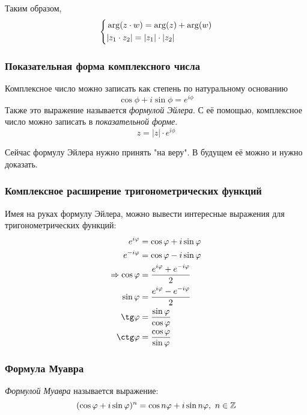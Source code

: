 Таким образом,
$$
    \left\{\begin{aligned}
    &\arg(z \cdot w) = \arg(z) + \arg(w)
    \\
    &|z_1 \cdot z_2| = |z_1| \cdot |z_2|
    \end{aligned}\right.
$$

\subsubsection{Показательная форма комплексного числа}

\begin{definition}
    Комплексное число можно записать как степень по натуральному основанию
    $$
        \cos \phi + i \sin \phi = e^{i \phi}
    $$
    Также это выражение называется \textit{формулой Эйлера}. С её помощью, комплексное число можно записать в \textit{показательной форме}.
    $$
        z = |z| \cdot e^{i \phi}
    $$
\end{definition}

\begin{note}
    Сейчас формулу Эйлера нужно принять "на веру". В будущем её можно и нужно доказать.
\end{note}

\subsubsection{Комплексное расширение тригонометрических функций}

Имея на руках формулу Эйлера, можно вывести интересные выражения для тригонометрических функций:
\begin{align*}
    e^{i\phi} &= \cos\phi + i \sin\phi
    \\
    e^{-i\phi} &= \cos\phi - i \sin\phi
    \\
    \Ra \cos\phi &= \frac{\dse e^{i\phi} + e^{-i\phi}}{2}
    \\
    \sin\phi &= \frac{\dse e^{i\phi} - e^{-i\phi}}{2}
    \\
    \tg\phi &= \frac{\sin\phi}{\cos\phi}
    \\
    \ctg\phi &= \frac{\cos\phi}{\sin\phi}
\end{align*}

\subsubsection{Формула Муавра}

\begin{definition}
    \textit{Формулой Муавра} называется выражение:
    $$
        (\cos \varphi + i \sin \varphi)^n = \cos n\varphi + i \sin n\varphi,\ n \in \mathbb{Z}
    $$
\end{definition}

